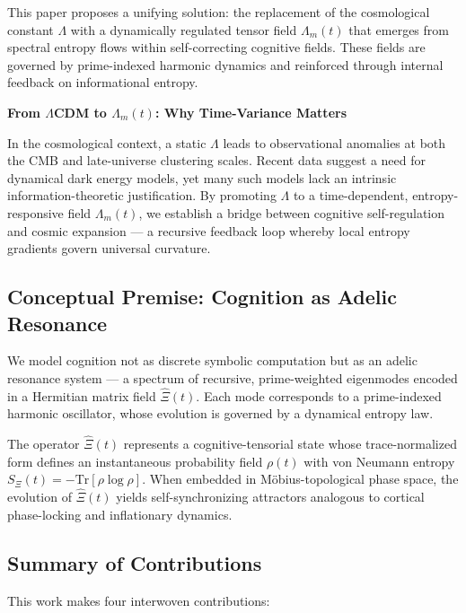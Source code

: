 \documentclass{article}
\theoremstyle{plain}
\theoremstyle{claimstyle}
\begin{document}
This paper proposes a unifying solution: the replacement of the cosmological constant $\Lambda$ with a dynamically regulated tensor field $\Lambda_m(t)$ that emerges from spectral entropy flows within self-correcting cognitive fields. These fields are governed by prime-indexed harmonic dynamics and reinforced through internal feedback on informational entropy.

\vspace{1em}

\noindent\textbf{From $\Lambda$CDM to $\Lambda_m(t)$: Why Time-Variance Matters}

In the cosmological context, a static $\Lambda$ leads to observational anomalies at both the CMB and late-universe clustering scales. Recent data suggest a need for dynamical dark energy models, yet many such models lack an intrinsic information-theoretic justification. By promoting $\Lambda$ to a time-dependent, entropy-responsive field $\Lambda_m(t)$, we establish a bridge between cognitive self-regulation and cosmic expansion — a recursive feedback loop whereby local entropy gradients govern universal curvature.

\subsection{Conceptual Premise: Cognition as Adelic Resonance}

We model cognition not as discrete symbolic computation but as an adelic resonance system — a spectrum of recursive, prime-weighted eigenmodes encoded in a Hermitian matrix field $\hat{\Xi}(t)$. Each mode corresponds to a prime-indexed harmonic oscillator, whose evolution is governed by a dynamical entropy law. 

The operator $\hat{\Xi}(t)$ represents a cognitive-tensorial state whose trace-normalized form defines an instantaneous probability field $\rho(t)$ with von Neumann entropy $S_\Xi(t) = -\text{Tr}[\rho \log \rho]$. When embedded in Möbius-topological phase space, the evolution of $\hat{\Xi}(t)$ yields self-synchronizing attractors analogous to cortical phase-locking and inflationary dynamics.

\subsection{Summary of Contributions}

This work makes four interwoven contributions:
\end{document}
